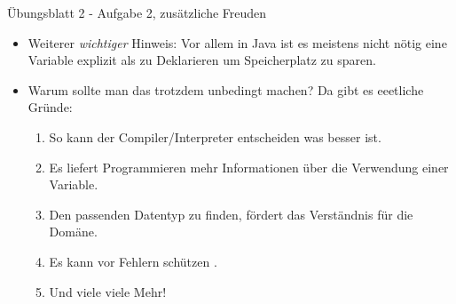 \begin{frame}[t]{Übungsblatt 2 - Aufgabe 2, zusätzliche Freuden}
    \begin{itemize}[<+(1)->]
        \itemsep11pt
        \item Weiterer \emph{wichtiger} Hinweis: \pause{}Vor allem in Java ist es meistens nicht nötig eine Variable explizit als  zu Deklarieren um Speicherplatz zu sparen.\pause\smallskip{}
        \item Warum sollte man das trotzdem unbedingt machen?\pause{} Da gibt es eeetliche Gründe:\smallskip \begin{enumerate}
            \itemsep3pt
            \item So kann der Compiler/Interpreter entscheiden was besser ist.
            \item Es liefert Programmieren mehr Informationen über die Verwendung einer Variable.
            \item Den passenden Datentyp zu finden, fördert das Verständnis für die Domäne.
            \item Es kann vor Fehlern schützen\pause{} .
            \item Und viele viele Mehr!
        \end{enumerate}
    \end{itemize}
\end{frame}
\fi

